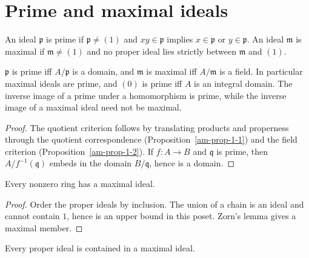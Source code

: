 \section{Prime and maximal ideals}
\label{am-ch1-prime-max}
\begin{definition}
\label{am-def-prime-max}
\uses{}
An ideal $\mathfrak{p}$ is prime if $\mathfrak{p}\ne(1)$ and $xy\in\mathfrak{p}$ implies $x\in\mathfrak{p}$ or
$y\in\mathfrak{p}$.  An ideal $\mathfrak{m}$ is maximal if $\mathfrak{m}\ne(1)$ and no proper ideal lies
strictly between $\mathfrak{m}$ and $(1)$.
\end{definition}
\begin{proposition}
\label{am-prop-prime-max-quotient}
\uses{}
$\mathfrak{p}$ is prime iff $A/\mathfrak{p}$ is a domain, and $\mathfrak{m}$ is maximal iff $A/\mathfrak{m}$ is a
field.  In particular maximal ideals are prime, and $(0)$ is prime iff $A$ is
an integral domain.  The inverse image of a prime under a homomorphism is
prime, while the inverse image of a maximal ideal need not be maximal.
\end{proposition}
\begin{proof}
The quotient criterion follows by translating products and properness through
the quotient correspondence (Proposition~\ref{am-prop-1-1}) and the field
criterion (Proposition~\ref{am-prop-1-2}).  If $f:A\to B$ and $\mathfrak{q}$ is prime,
then $A/f^{-1}(\mathfrak{q})$ embeds in the domain $B/\mathfrak{q}$, hence is a domain.
\end{proof}
\begin{theorem}
\label{am-thm-1-3}
\uses{}
Every nonzero ring has a maximal ideal.
\end{theorem}
\begin{proof}
Order the proper ideals by inclusion.  The union of a chain is an ideal and
cannot contain $1$, hence is an upper bound in this poset.  Zorn's lemma gives
a maximal member.
\end{proof}
\begin{corollary}
\label{am-cor-1-4}
\uses{}
Every proper ideal is contained in a maximal ideal.
\end{corollary}
